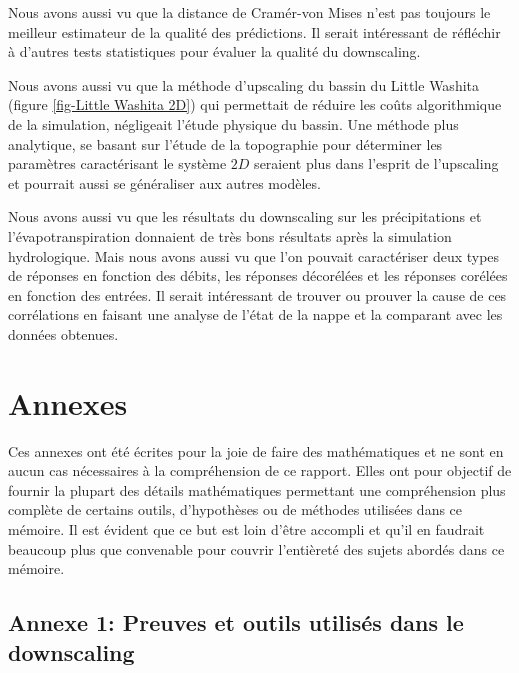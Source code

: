 \documentclass[a4paper,11pt]{article}
\numberwithin{equation}{section}
\begin{document}
Nous avons aussi vu que la distance de Cramér-von Mises n'est pas toujours le meilleur estimateur de la qualité des prédictions. Il serait intéressant de réfléchir à d'autres tests statistiques pour évaluer la qualité du downscaling. 

Nous avons aussi vu que la méthode d'upscaling du bassin du Little Washita (figure \ref{fig-Little Washita 2D}) qui permettait de réduire les coûts algorithmique de la simulation, négligeait l'étude physique du bassin. Une méthode plus analytique, se basant sur l'étude de la topographie pour déterminer les paramètres caractérisant le système $2D$ seraient plus dans l'esprit de l'upscaling et pourrait aussi se généraliser aux autres modèles.

Nous avons aussi vu que les résultats du downscaling sur les précipitations et l'évapotranspiration donnaient de très bons résultats après la simulation hydrologique. Mais nous avons aussi vu que l'on pouvait caractériser deux types de réponses en fonction des débits, les réponses décorélées et les réponses corélées en fonction des entrées. Il serait intéressant de trouver ou prouver la cause de ces corrélations en faisant une analyse de l'état de la nappe et la comparant avec les données obtenues. 



\newpage
\section{Annexes}

Ces annexes ont été écrites pour la joie de faire des mathématiques et ne sont en aucun cas nécessaires à la compréhension de ce rapport. Elles ont pour objectif de fournir la plupart des détails mathématiques permettant une compréhension plus complète de certains outils, d'hypothèses ou de méthodes utilisées dans ce mémoire. Il est évident que ce but est loin d'être accompli et qu'il en faudrait beaucoup plus que convenable pour couvrir l'entièreté des sujets abordés dans ce mémoire.
 
\subsection{Annexe 1: Preuves et outils utilisés dans le downscaling}
\label{ch:outils-mathematiques}
\end{document}
